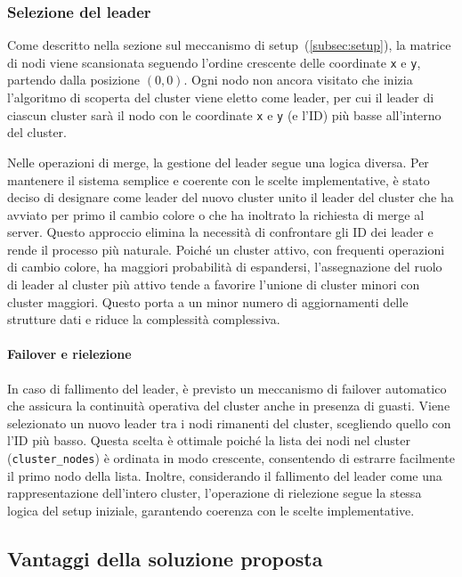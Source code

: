 \documentclass[12pt, a4paper]{report}
\begin{document}
\subsubsection{Selezione del leader}

Come descritto nella sezione sul meccanismo di setup~(\ref{subsec:setup}), la matrice di nodi viene scansionata seguendo l'ordine crescente delle coordinate \texttt{x} e \texttt{y}, partendo dalla posizione $(0,0)$. Ogni nodo non ancora visitato che inizia l'algoritmo di scoperta del cluster viene eletto come leader, per cui il leader di ciascun cluster sarà il nodo con le coordinate \texttt{x} e \texttt{y} (e l'ID) più basse all'interno del cluster.

Nelle operazioni di merge, la gestione del leader segue una logica diversa. Per mantenere il sistema semplice e coerente con le scelte implementative, è stato deciso di designare come leader del nuovo cluster unito il leader del cluster che ha avviato per primo il cambio colore o che ha inoltrato la richiesta di merge al server. Questo approccio elimina la necessità di confrontare gli ID dei leader e rende il processo più naturale. Poiché un cluster attivo, con frequenti operazioni di cambio colore, ha maggiori probabilità di espandersi, l'assegnazione del ruolo di leader al cluster più attivo tende a favorire l'unione di cluster minori con cluster maggiori. Questo porta a un minor numero di aggiornamenti delle strutture dati e riduce la complessità complessiva.

\paragraph{Failover e rielezione}
In caso di fallimento del leader, è previsto un meccanismo di failover automatico che assicura la continuità operativa del cluster anche in presenza di guasti. Viene selezionato un nuovo leader tra i nodi rimanenti del cluster, scegliendo quello con l'ID più basso. Questa scelta è ottimale poiché la lista dei nodi nel cluster (\texttt{cluster\_nodes}) è ordinata in modo crescente, consentendo di estrarre facilmente il primo nodo della lista. Inoltre, considerando il fallimento del leader come una rappresentazione dell'intero cluster, l'operazione di rielezione segue la stessa logica del setup iniziale, garantendo coerenza con le scelte implementative.


\subsection{Vantaggi della soluzione proposta}
\end{document}
